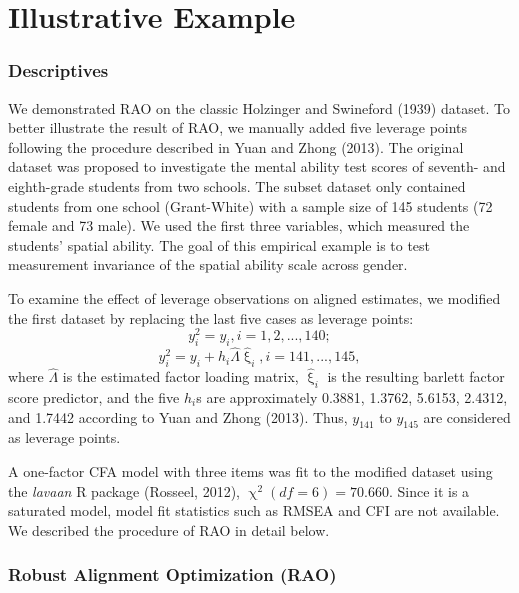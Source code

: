\documentclass[
  man]{apa7}
\let\chi\upchi
\let\xi\upxi
\begin{document}
\section{Illustrative Example}\label{illustrative-example}

\subsubsection{Descriptives}\label{descriptives}

We demonstrated RAO on the classic Holzinger and Swineford (1939) dataset. To better illustrate the result of RAO, we manually added five leverage points following the procedure described in Yuan and Zhong (2013). The original dataset was proposed to investigate the mental ability test scores of seventh- and eighth-grade students from two schools. The subset dataset only contained students from one school (Grant-White) with a sample size of 145 students (72 female and 73 male). We used the first three variables, which measured the students' spatial ability. The goal of this empirical example is to test measurement invariance of the spatial ability scale across gender.

To examine the effect of leverage observations on aligned estimates, we modified the first dataset by replacing the last five cases as leverage points:
\begin{equation}
y_{i}^{2} = y_{i}, i = 1,2,...,140;
\end{equation}
\begin{equation}
y_{i}^{2} = y_{i} + h_{i}\hat{\Lambda}\hat{\xi}_{i}, i = 141,...,145,
\end{equation}
where \(\hat{\Lambda}\) is the estimated factor loading matrix, \(\hat{\xi}_{i}\) is the resulting barlett factor score predictor, and the five \(h_{i}\)s are approximately 0.3881, 1.3762, 5.6153, 2.4312, and 1.7442 according to Yuan and Zhong (2013). Thus, \(y_{141}\) to \(y_{145}\) are considered as leverage points.

A one-factor CFA model with three items was fit to the modified dataset using the \emph{lavaan} R package (Rosseel, 2012), \(\chi^2(df = 6) = 70.660\). Since it is a saturated model, model fit statistics such as RMSEA and CFI are not available. We described the procedure of RAO in detail below.

\subsubsection{Robust Alignment Optimization (RAO)}\label{robust-alignment-optimization-rao}
\end{document}
